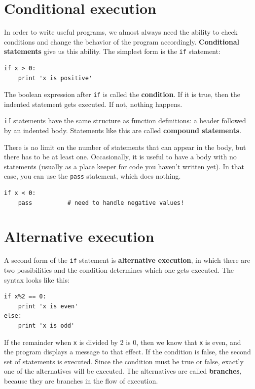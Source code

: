 \documentclass[10pt]{book}
\begin{document}
\begin{CJK}{UTF8}{gbsn}
\section{Conditional execution}
\label{conditional.execution}

In order to write useful programs, we almost always need the ability
to check conditions and change the behavior of the program
accordingly.  {\bf Conditional statements} give us this ability.  The
simplest form is the {\tt if} statement:

\begin{verbatim}
if x > 0:
    print 'x is positive'
\end{verbatim}
%
The boolean expression after {\tt if} is
called the {\bf condition}.  If it is true, then the indented
statement gets executed.  If not, nothing happens.

{\tt if} statements have the same structure as function definitions:
a header followed by an indented body.  Statements like this are
called {\bf compound statements}.

There is no limit on the number of statements that can appear in
the body, but there has to be at least one.
Occasionally, it is useful to have a body with no statements (usually
as a place keeper for code you haven't written yet).  In that
case, you can use the {\tt pass} statement, which does nothing.

\begin{verbatim}
if x < 0:
    pass          # need to handle negative values!
\end{verbatim}
%

\section{Alternative execution}
\label{alternative.execution}

A second form of the {\tt if} statement is {\bf alternative execution},
in which there are two possibilities and the condition determines
which one gets executed.  The syntax looks like this:

\begin{verbatim}
if x%2 == 0:
    print 'x is even'
else:
    print 'x is odd'
\end{verbatim}
%
If the remainder when {\tt x} is divided by 2 is 0, then we
know that {\tt x} is even, and the program displays a message to that
effect.  If the condition is false, the second set of statements is
executed.  Since the condition must be true or false, exactly one of
the alternatives will be executed.  The alternatives are called
{\bf branches}, because they are branches in the flow of execution.




\end{CJK}
\end{document}
